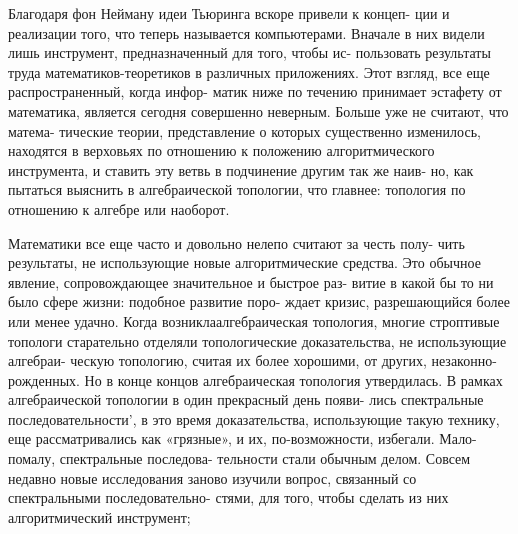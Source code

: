 {{   Благодаря фон Нейману идеи Тьюринга вскоре привели к концеп-\linebreak
ции и реализации того, что теперь называется компьютерами. Вначале\linebreak
в них видели лишь инструмент, предназначенный для того, чтобы ис-\linebreak
пользовать результаты труда математиков-теоретиков в различных\linebreak
приложениях. Этот взгляд, все еще распространенный, когда инфор-\linebreak
матик ниже по течению принимает эстафету от математика, является\linebreak
сегодня совершенно неверным. Больше уже не считают, что матема-\linebreak
тические теории, представление о которых существенно изменилось,\linebreak
находятся в верховьях по отношению к положению алгоритмического\linebreak
инструмента, и ставить эту ветвь в подчинение другим так же наив-\linebreak
но, как пытаться выяснить в алгебраической топологии, что главнее:\linebreak
топология по отношению к алгебре или наоборот.

   Математики все еще часто и довольно нелепо считают за честь полу-\linebreak
чить результаты, не использующие новые алгоритмические средства.\linebreak
Это обычное явление, сопровождающее значительное и быстрое раз-\linebreak
витие в какой бы то ни было сфере жизни: подобное развитие поро-\linebreak
ждает кризис, разрешающийся более или менее удачно. Когда возникла\linebreak алгебраическая топология, многие строптивые топологи старательно\linebreak
отделяли топологические доказательства, не использующие алгебраи-\linebreak
ческую топологию, считая их более хорошими, от других, незаконно-\linebreak
рожденных. Но в конце концов алгебраическая топология утвердилась.\linebreak
В рамках алгебраической топологии в один прекрасный день появи-\linebreak
лись спектральные последовательности', в это время доказательства,\linebreak
использующие такую технику, еще рассматривались как «грязные», и\linebreak
их, по-возможности, избегали. Мало-помалу, спектральные последова-\linebreak
тельности стали обычным делом. Совсем недавно новые исследования\linebreak
заново изучили вопрос, связанный со спектральными последовательно-\linebreak
стями, для того, чтобы сделать из них алгоритмический инструмент;\linebreak

}}
